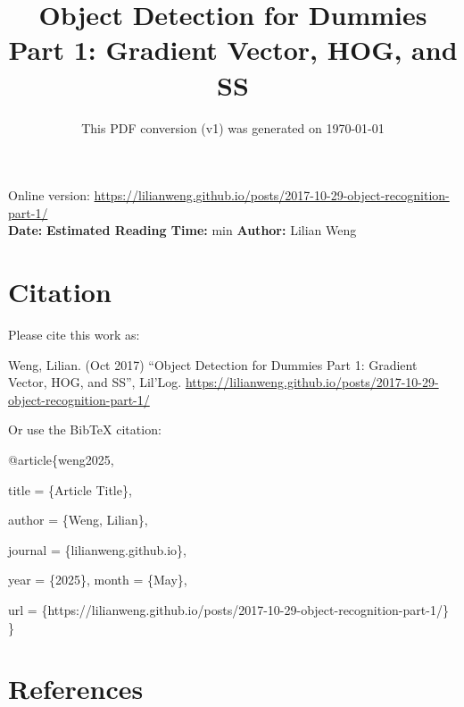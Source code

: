 \documentclass[12pt]{article}
\title{Object Detection for Dummies Part 1: Gradient Vector, HOG, and SS}
\date{This PDF conversion (v1) was generated on \today\footnotemark}
\begin{document}
\maketitle
\begin{center}
    Online version: \url{https://lilianweng.github.io/posts/2017-10-29-object-recognition-part-1/} \\
    \textbf{Date:} \quad
    \textbf{Estimated Reading Time:}  min \quad
    \textbf{Author:} Lilian Weng
\end{center}




\newpage
\tableofcontents
\newpage
\vspace{1em}
\n\n\n\section{Citation}
Please cite this work as:

\begin{tcolorbox}[colback=black!5!white, colframe=black!80!white, boxrule=0.5pt, arc=2mm, left=1mm, right=1mm, top=1mm, bottom=1mm]
  Weng, Lilian. (Oct 2017) ``Object Detection for Dummies Part 1: Gradient Vector, HOG, and SS'', Lil'Log. \url{https://lilianweng.github.io/posts/2017-10-29-object-recognition-part-1/}
  \end{tcolorbox}

Or use the BibTeX citation:

\begin{tcolorbox}[
    colback=black!5!white,
    colframe=black!80!white,
    boxrule=0.5pt,
    arc=2mm,
    left=1mm,
    right=1mm,
    top=1mm,
    bottom=1mm,
    listing only,
    listing options={
      basicstyle=\ttfamily\footnotesize,
      breaklines=true,
      literate={\{}{{\char`\{}}1 {\}}{{\char`\}}}1
    }
  ]
  @article\{weng2025,

    title   = \{Article Title\},

    author  = \{Weng, Lilian\},

    journal = \{lilianweng.github.io\},

    year    = \{2025\},
    month   = \{May\},

    url     = \{https://lilianweng.github.io/posts/2017-10-29-object-recognition-part-1/\}\n
  \}
  \end{tcolorbox}

\newpage
\section{References}

\n
\end{document}
